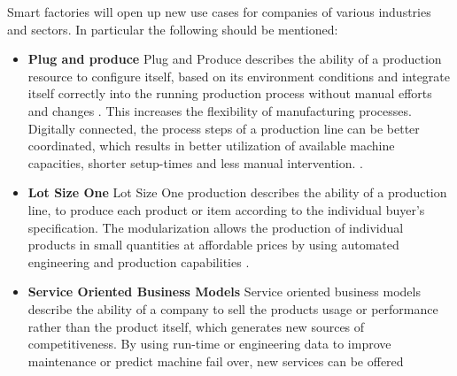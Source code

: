 Smart factories will open up new use cases for companies of various industries and sectors. In particular the following should be mentioned:
\begin{itemize}
    \item[] \textbf{Plug and produce} Plug and Produce describes the ability of a production resource to configure itself, based on its environment conditions and integrate itself correctly into the running production process without manual efforts and changes \cite[p.146]{Ye20204.0}. This increases the flexibility of manufacturing processes. Digitally connected, the process steps of a production line can be better coordinated, which results in better utilization of available machine capacities, shorter setup-times and less manual intervention. \cite[p.16]{Acatech2013Recommendations4.0}. 
    \item[] \textbf{Lot Size One} Lot Size One production describes the ability of a production line, to produce each product or item according to the individual buyer's specification. The modularization allows the production of individual products in small quantities at affordable prices by using automated engineering and production capabilities \cite[p.15]{Acatech2013Recommendations4.0}.
    \item[] \textbf{Service Oriented Business Models} Service oriented business models describe the ability of a company to sell the products usage or performance rather than the product itself, which generates new sources of competitiveness. By using run-time or engineering data to improve maintenance or predict machine fail over, new services can be offered \cite{Bendig2021Equipment-as-a-ServiceIndustry} \cite[p.16]{Acatech2013Recommendations4.0}
\end{itemize}

